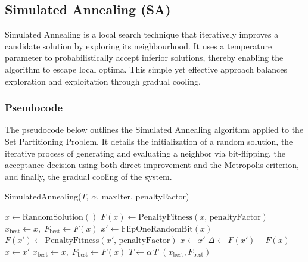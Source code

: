 \documentclass[12pt]{article}
\begin{document}
\subsection{Simulated Annealing (SA)}
Simulated Annealing is a local search technique that iteratively improves a candidate solution by exploring its neighbourhood. It uses a temperature parameter to probabilistically accept inferior solutions, thereby enabling the algorithm to escape local optima. This simple yet effective approach balances exploration and exploitation through gradual cooling.

\subsubsection{Pseudocode}
The pseudocode below outlines the Simulated Annealing algorithm applied to the Set Partitioning Problem. It details the initialization of a random solution, the iterative process of generating and evaluating a neighbor via bit-flipping, the acceptance decision using both direct improvement and the Metropolis criterion, and finally, the gradual cooling of the system.

\begin{algorithm}[htbp]
  \caption{SimulatedAnnealing(\(T\), \(\alpha\), maxIter, penaltyFactor)}
  \begin{algorithmic}[1]
    \State \(x \gets \text{RandomSolution}()\) 
    \State \(F(x) \gets \text{PenaltyFitness}(x,\,\text{penaltyFactor})\)
    \State \(x_{\text{best}} \gets x,\; F_{\text{best}} \gets F(x)\)
      \State \(x' \gets \text{FlipOneRandomBit}(x)\) 
      \State \(F(x') \gets \text{PenaltyFitness}(x',\,\text{penaltyFactor})\)
        \State \(x \gets x'\) 
      \Else
        \State \(\Delta \gets F(x') - F(x)\)
          \State \(x \gets x'\) 
        \EndIf
      \EndIf
        \State \(x_{\text{best}} \gets x,\; F_{\text{best}} \gets F(x)\) 
      \EndIf
      \State \(T \gets \alpha \, T\) 
    \EndFor
    \State \Return \((x_{\text{best}}, F_{\text{best}})\)
  \end{algorithmic}
  \end{algorithm}
\end{document}
